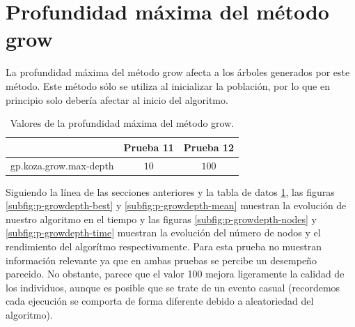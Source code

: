 \section{Profundidad máxima del método grow}\label{sec:p-prof-grow}

La profundidad máxima del método grow afecta a los árboles generados por este
método. Este método sólo se utiliza al inicializar la población, por lo que en
principio solo debería afectar al inicio del algoritmo.

\begin{table}[cbt]
\caption{Valores de la profundidad máxima del método grow.}
\label{tab:prof-grow}
\centering
\begin{tabular}{lcc}
\toprule
  &\textbf{Prueba 11} & \textbf{Prueba 12}\\
\midrule
gp.koza.grow.max-depth & $10$ & $100$  \\
\bottomrule
\end{tabular}
\end{table}

Siguiendo la línea de las secciones anteriores y la tabla de datos
\ref{tab:prof-grow}, las figuras \ref{subfig:p-growdepth-best} y
\ref{subfig:p-growdepth-mean} muestran la evolución de nuestro algoritmo en el
tiempo y las figuras \ref{subfig:p-growdepth-nodes} y
\ref{subfig:p-growdepth-time} muestran la evolución del número de nodos y el
rendimiento del algorítmo respectivamente. Para esta prueba no muestran
información relevante ya que en ambas pruebas se percibe un desempeño parecido.
No obstante, parece que el valor 100 mejora ligeramente la calidad de los
individuos, aunque es posible que se trate de un evento casual (recordemos cada
ejecución se comporta de forma diferente debido a aleatoriedad del algoritmo).

